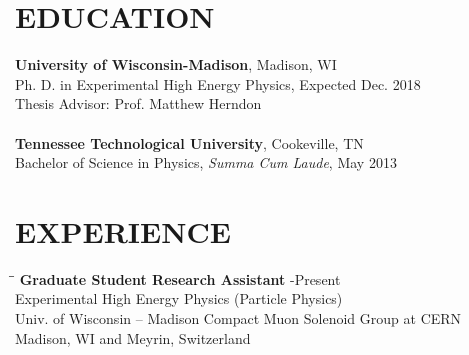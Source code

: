 \documentclass[10pt]{res} %
\begin{document}

\address{{\bf Current Address} \\  CERN 32/4-B03  \\  CH-1211 Geneva 23 \\ Switzerland }
\address{{\bf Permanent Address} \\ 141 County Hill Rd. \\ Blountville,
TN 37617 \\ (608) 443-9459}

\begin{resume}

\section{EDUCATION}
  \textbf{University of Wisconsin-Madison}, Madison, WI \\
Ph. D. in Experimental High Energy Physics, Expected Dec. 2018 \\
Thesis Advisor: Prof. Matthew Herndon \\
\\
  \textbf{Tennessee Technological University}, Cookeville, TN \\
Bachelor of Science in Physics, \textit{Summa Cum Laude}, May 2013 \\

\section{EXPERIENCE}
\vspace{-0.1in}
\begin{tabbing}
\hspace{2.3in}\= \hspace{2.5in}\= \kill %
{\bf Graduate Student Research Assistant} \>-Present \\
Experimental High Energy Physics  (Particle Physics)\\
Univ. of Wisconsin -- Madison Compact Muon Solenoid Group at CERN   \\  Madison, WI and Meyrin, Switzerland \\
\end{tabbing}\vspace{-20pt}      %


\end{resume}
\end{document}
